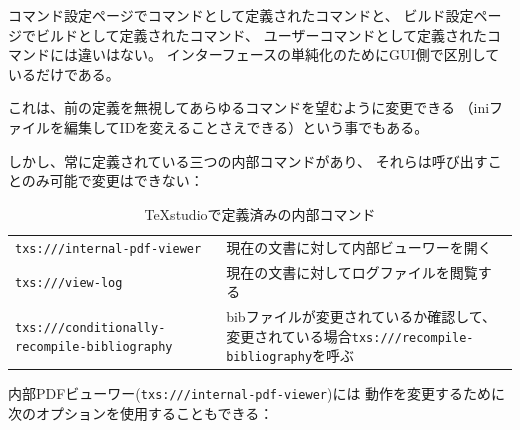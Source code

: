 コマンド設定ページでコマンドとして定義されたコマンドと、
ビルド設定ページでビルドとして定義されたコマンド、
ユーザーコマンドとして定義されたコマンドには違いはない。
インターフェースの単純化のためにGUI側で区別しているだけである。

これは、前の定義を無視してあらゆるコマンドを望むように変更できる
（iniファイルを編集してIDを変えることさえできる）という事でもある。

しかし、常に定義されている三つの内部コマンドがあり、
それらは呼び出すことのみ可能で変更はできない：

\begin{table}[H]
  \centering
  \caption{TeXstudioで定義済みの内部コマンド}
  \begin{tabularx}{\linewidth}{lX}
    \hline
    \texttt{txs:///internal-pdf-viewer} & 現在の文書に対して内部ビューワーを開く\\
    \texttt{txs:///view-log} & 現在の文書に対してログファイルを閲覧する\\
    \texttt{txs:///conditionally-recompile-bibliography}
      & bibファイルが変更されているか確認して、
      変更されている場合\texttt{txs:///recompile-bibliography}を呼ぶ\\
    \hline
  \end{tabularx}
\end{table}

内部PDFビューワー(\texttt{txs:///internal-pdf-viewer})には
動作を変更するために次のオプションを使用することもできる：


